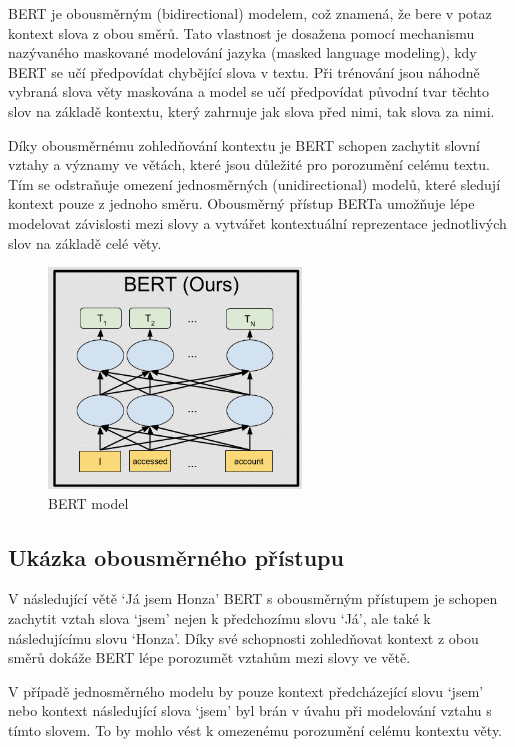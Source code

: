 BERT je obousměrným (bidirectional) modelem, což znamená, že bere v potaz kontext slova z obou směrů.
Tato vlastnost je dosažena pomocí mechanismu nazývaného maskované modelování jazyka (masked language modeling), kdy BERT se učí předpovídat chybějící slova v textu.
Při trénování jsou náhodně vybraná slova věty maskována a model se učí předpovídat původní tvar těchto slov na základě kontextu, který zahrnuje jak slova před nimi, tak slova za nimi.

Díky obousměrnému zohledňování kontextu je BERT schopen zachytit slovní vztahy a významy ve větách, které jsou důležité pro porozumění celému textu.
Tím se odstraňuje omezení jednosměrných (unidirectional) modelů, které sledují kontext pouze z jednoho směru.
Obousměrný přístup BERTa umožňuje lépe modelovat závislosti mezi slovy a vytvářet kontextuální reprezentace jednotlivých slov na základě celé věty.

\begin{figure}[H]
	\centering
	\includegraphics[width=0.6\textwidth]{Figures/BERT.png}
	\caption{BERT model~\cite{link24}}\label{fig:BERT model}
\end{figure}

\subsection{Ukázka obousměrného přístupu}
V následující větě `Já jsem Honza' BERT s obousměrným přístupem je schopen zachytit vztah slova `jsem' nejen k předchozímu slovu `Já', ale také k následujícímu slovu `Honza'.
Díky své schopnosti zohledňovat kontext z obou směrů dokáže BERT lépe porozumět vztahům mezi slovy ve větě.

V případě jednosměrného modelu by pouze kontext předcházející slovu `jsem' nebo kontext následující slova `jsem' byl brán v úvahu při modelování vztahu s tímto slovem.
To by mohlo vést k omezenému porozumění celému kontextu věty.

